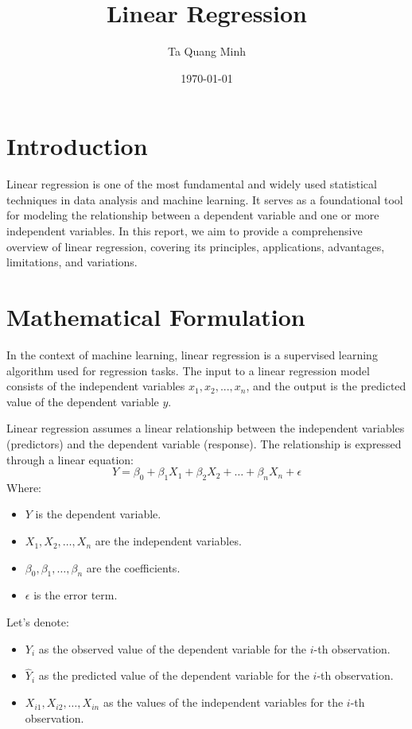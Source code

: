 \documentclass{article}
\title{Linear Regression}
\author{Ta Quang Minh}
\date{\today}
\begin{document}
\maketitle

\section{Introduction}
Linear regression is one of the most fundamental and widely used statistical techniques in data analysis and machine learning. It serves as a foundational tool for modeling the relationship between a dependent variable and one or more independent variables. In this report, we aim to provide a comprehensive overview of linear regression, covering its principles, applications, advantages, limitations, and variations.

\section{Mathematical Formulation}

In the context of machine learning, linear regression is a supervised learning algorithm used for regression tasks. The input to a linear regression model consists of the independent variables \( x_1, x_2, ..., x_n \), and the output is the predicted value of the dependent variable \( y \).

Linear regression assumes a linear relationship between the independent variables (predictors) and the dependent variable (response). The relationship is expressed through a linear equation:
\begin{equation}
    Y = \beta_0 + \beta_1X_1 + \beta_2X_2 + \ldots + \beta_nX_n + \epsilon
\end{equation}
Where:
\begin{itemize}
    \item $Y$ is the dependent variable.
    \item $X_1, X_2, \ldots, X_n$ are the independent variables.
    \item $\beta_0, \beta_1, \ldots, \beta_n$ are the coefficients.
    \item $\epsilon$ is the error term.
\end{itemize}


Let's denote:
\begin{itemize}
    \item $Y_i$ as the observed value of the dependent variable for the $i$-th observation.
    \item $\hat{Y}_i$ as the predicted value of the dependent variable for the $i$-th observation.
    \item $X_{i1}, X_{i2}, \ldots, X_{in}$ as the values of the independent variables for the $i$-th observation.
\end{itemize}
\end{document}
